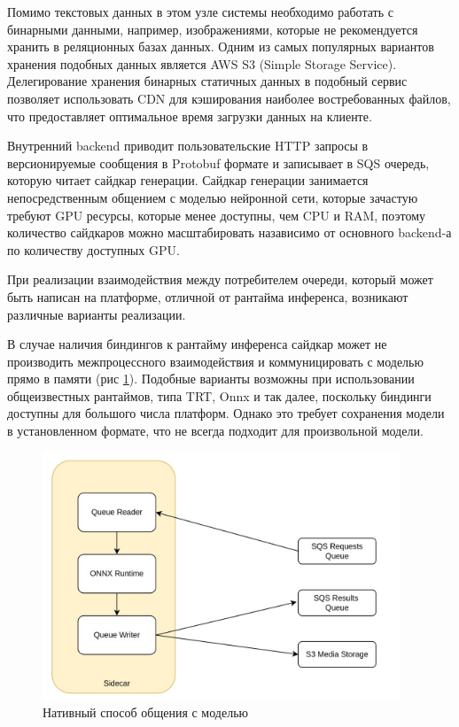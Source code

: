 Помимо текстовых данных в этом узле системы необходимо работать с бинарными данными, например, изображениями, которые
не рекомендуется хранить в реляционных базах данных. Одним из самых популярных вариантов хранения подобных данных
является AWS S3 (Simple Storage Service). Делегирование хранения бинарных статичных данных в подобный сервис позволяет
использовать CDN для кэширования наиболее востребованных файлов, что предоставляет оптимальное время загрузки данных на клиенте.

Внутренний backend приводит пользовательские HTTP запросы в версионируемые сообщения в Protobuf формате и
записывает в SQS очередь, которую читает сайдкар генерации. Сайдкар генерации занимается непосредственным общением
с моделью нейронной сети, которые зачастую требуют GPU ресурсы, которые менее доступны, чем CPU и RAM, поэтому
количество сайдкаров можно масштабировать назависимо от основного backend-а по количеству доступных GPU.

При реализации взаимодействия между потребителем очереди, который может быть написан на платформе, отличной
от рантайма инференса, возникают различные варианты реализации.

В случае наличия биндингов к рантайму инференса сайдкар может не производить межпроцессного взаимодействия
и коммуницировать с моделью прямо в памяти (рис \ref{fig:side1}). Подобные варианты возможны при использовании 
общеизвестных рантаймов, типа TRT, Onnx и так далее, поскольку биндинги доступны для большого числа платформ.
Однако это требует сохранения модели в установленном формате, что не всегда подходит для произвольной модели.

\begin{footnotesize}
\begin{figure}[H]
  \centering
  \includegraphics[width=0.95\textwidth]{img/side1.jpg}
  \caption{Нативный способ общения с моделью}
    \label{fig:side1}
\end{figure}
\end{footnotesize}


